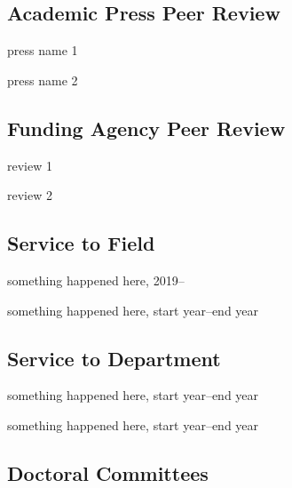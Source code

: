 \documentclass[12pt,letterpaper]{report}
\newcommand{\listitemspace}{0.25em}
\renewenvironment{itemize}
{\begin{list}{}{\setlength{\leftmargin}{0em}
                \setlength{\parskip}{0em}
                \setlength{\itemsep}{\listitemspace}
                \setlength{\parsep}{\listitemspace}}}
{\end{list}}
\begin{document}
    \subsection*{Academic Press Peer Review}

    \begin{itemize}

        \item press name 1
        \item press name 2

    \end{itemize}

    \subsection*{Funding Agency Peer Review}

    \begin{itemize}

        \item review 1
        \item review 2

    \end{itemize}

    \subsection*{Service to Field}

    \begin{itemize}

        \item something happened here, 2019--\the\year
        \item something happened here, start year--end year

    \end{itemize}

    \subsection*{Service to Department}

    \begin{itemize}

        \item something happened here, start year--end year
        \item something happened here, start year--end year

    \end{itemize}

    \subsection*{Doctoral Committees}
\end{document}
